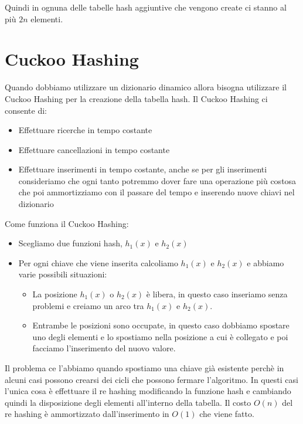 \documentclass[14pt]{extreport}
\begin{document}
Quindi in ognuna delle tabelle hash aggiuntive che vengono create ci stanno al più $2n$ elementi.



\section{Cuckoo Hashing}

Quando dobbiamo utilizzare un dizionario dinamico allora bisogna utilizzare il Cuckoo Hashing per la creazione della tabella hash.
Il Cuckoo Hashing ci consente di:
\begin{itemize}
\item Effettuare ricerche in tempo costante
\item Effettuare cancellazioni in tempo costante
\item Effettuare inserimenti in tempo costante, anche se per gli inserimenti consideriamo che ogni tanto potremmo dover fare una operazione più costosa che poi ammortizziamo con il passare del tempo e inserendo nuove chiavi nel dizionario
\end{itemize}


Come funziona il Cuckoo Hashing:

\begin{itemize}
\item Scegliamo due funzioni hash, $h_1(x)$ e $h_2(x)$
\item Per ogni chiave che viene inserita calcoliamo $h_1(x)$ e $h_2(x)$ e abbiamo varie possibili situazioni:
\begin{itemize}
\item La posizione $h_1(x)$ o $h_2(x)$ è libera, in questo caso inseriamo senza problemi e creiamo un arco tra $h_1(x)$ e $h_2(x)$.
\item Entrambe le posizioni sono occupate, in questo caso dobbiamo spostare uno degli elementi e lo spostiamo nella posizione a cui è collegato e poi facciamo l'inserimento del nuovo valore.
\end{itemize}
\end{itemize}


Il problema ce l'abbiamo quando spostiamo una chiave già esistente perchè in alcuni casi possono crearsi dei cicli che possono fermare l'algoritmo. In questi casi l'unica cosa è effettuare il re hashing modificando la funzione hash e cambiando quindi la disposizione degli elementi all'interno della tabella. Il costo $O(n)$ del re hashing è ammortizzato dall'inserimento in $O(1)$ che viene fatto.
\end{document}
